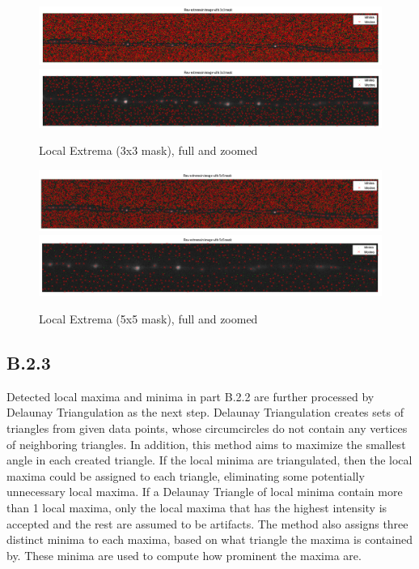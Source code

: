 \documentclass{article}
\begin{document}
\begin{figure}[H]
\centering
\includegraphics[width=16cm]{figures/extrema_3_full.png}
\includegraphics[width=16cm]{figures/extrema_3_zoom.png}
\caption{Local Extrema (3x3 mask), full and zoomed}
\label{fig:extrema_3}
\end{figure}

\begin{figure}[H]
\centering
\includegraphics[width=16cm]{figures/extrema_5_full.png}
\includegraphics[width=16cm]{figures/extrema_5_zoom.png}
\caption{Local Extrema (5x5 mask), full and zoomed}
\label{fig:extrema_5}
\end{figure}



\subsection*{B.2.3}

Detected local maxima and minima in part B.2.2 are further processed by Delaunay Triangulation\cite{delaunaywiki}\cite{delaunaymathworks} as the next step. Delaunay Triangulation creates sets of triangles from given data points, whose circumcircles do not contain any vertices of neighboring triangles. In addition, this method aims to maximize the smallest angle in each created triangle. If the local minima are triangulated, then the local maxima could be assigned to each triangle, eliminating some potentially unnecessary local maxima. If a Delaunay Triangle of local minima contain more than 1 local maxima, only the local maxima that has the highest intensity is accepted and the rest are assumed to be artifacts. The method also assigns three distinct minima to each maxima, based on what triangle the maxima is contained by. These minima are used to compute how prominent the maxima are.
\end{document}
